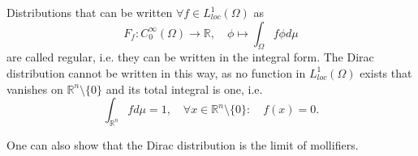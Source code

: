 \documentclass[A4,12pt,twoside]{book}
\begin{document}
Distributions that can be written $\forall f \in L_{loc}^1 (\Omega)$ as 
\[
F_f : C_0^\infty (\Omega) \to \mathbb{R}, \quad \phi \mapsto \int_\Omega f \phi d \mu 
\]
are called regular, i.e. they can be written in the integral form. The Dirac distribution cannot be written in this way, as no function in $L_{loc}^1(\Omega)$ exists that vanishes on $\mathbb{R}^n \setminus \{0\}$ and its total integral is one, i.e. 
\[
\int_{\mathbb{R}^n} f d \mu =1, \quad \forall x \in \mathbb{R}^n \setminus \{0 \}: \quad f(x)=0.
\]

One can also show that the Dirac distribution is the limit of mollifiers.
\end{document}
